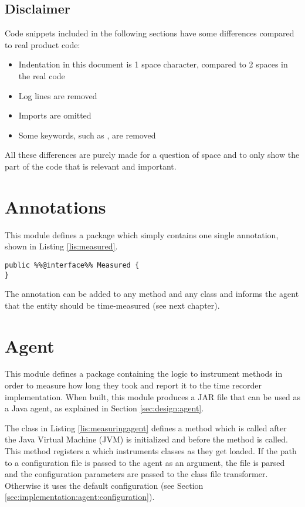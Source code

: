 \subsection{Disclaimer}
Code snippets included in the following sections have some differences compared to real product code:
\begin{itemize}
  \item Indentation in this document is 1 space character, compared to 2 spaces in the real code
  \item Log lines are removed
  \item Imports are omitted
  \item Some keywords, such as , are removed
\end{itemize}

\noindent All these differences are purely made for a question of space and to only show the part of the code that is relevant and important.

\section{Annotations}
\label{sec:implementation:annotations} 
This module defines a package  which simply contains one single annotation, shown in Listing \ref{lis:measured}.
\begin{lstlisting}[caption={Measured annotation},label=lis:measured]
public %%@interface%% Measured {
}
\end{lstlisting}

\noindent The annotation can be added to any method and any class and informs the agent that the entity should be time-measured (see next chapter).


\section{Agent}
\label{sec:implementation:agent} 
This module defines a package  containing the logic to instrument methods in order to measure how long they took and report it to the time recorder implementation. When built, this module produces a JAR file that can be used as a Java agent, as explained in Section \ref{sec:design:agent}.

\noindent The  class in Listing \ref{lis:measuringagent} defines a  method which is called after the Java Virtual Machine (JVM) is initialized and before the  method is called. This method registers a  which instruments classes as they get loaded. If the path to a configuration file is passed to the agent as an argument, the file is parsed and the configuration parameters are passed to the class file transformer. Otherwise it uses the default configuration (see Section \ref{sec:implementation:agent:configuration}).

